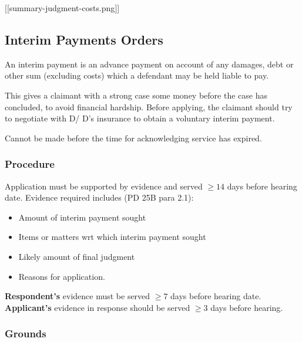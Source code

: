 \documentclass[
]{article}
\newenvironment{Shaded}{}{}
\newcommand{\NormalTok}[1]{#1}
\providecommand{\tightlist}{%
  \setlength{\itemsep}{0pt}\setlength{\parskip}{0pt}}
\begin{document}
{[}{[}summary-judgment-costs.png{]}{]}

\hypertarget{interim-payments-orders}{%
\subsection{Interim Payments Orders}\label{interim-payments-orders}}

\begin{Shaded}
\begin{Highlighting}[]
\NormalTok{An interim payment is an advance payment on account of any damages, debt or other sum (excluding costs) which a defendant may be held liable to pay.}
\end{Highlighting}
\end{Shaded}

This gives a claimant with a strong case some money before the case has
concluded, to avoid financial hardship. Before applying, the claimant
should try to negotiate with D/ D's insurance to obtain a voluntary
interim payment.

Cannot be made before the time for acknowledging service has expired.

\hypertarget{procedure-1}{%
\subsubsection{Procedure}\label{procedure-1}}

Application must be supported by evidence and served \(\geq 14\) days
before hearing date. Evidence required includes (PD 25B para 2.1):

\begin{itemize}
\tightlist
\item
  Amount of interim payment sought
\item
  Items or matters wrt which interim payment sought
\item
  Likely amount of final judgment
\item
  Reasons for application.
\end{itemize}

\textbf{Respondent's} evidence must be served \(\geq 7\) days before
hearing date. \textbf{Applicant's} evidence in response should be served
\(\geq 3\) days before hearing.

\hypertarget{grounds-1}{%
\subsubsection{Grounds}\label{grounds-1}}
\end{document}
